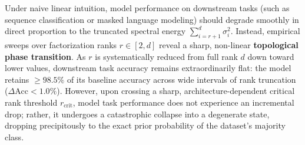 Under naive linear intuition, model performance on downstream tasks (such as sequence classification or masked language modeling) should degrade smoothly in direct proportion to the truncated spectral energy $\sum_{i=r+1}^{d} \sigma_i^2$. Instead, empirical sweeps over factorization ranks $r \in [2, d]$ reveal a sharp, non-linear \textbf{topological phase transition}. As $r$ is systematically reduced from full rank $d$ down toward lower values, downstream task accuracy remains extraordinarily flat: the model retains $\ge 98.5\%$ of its baseline accuracy across wide intervals of rank truncation ($\Delta \text{Acc} < 1.0\%$). However, upon crossing a sharp, architecture-dependent critical rank threshold $r_{\text{crit}}$, model task performance does not experience an incremental drop; rather, it undergoes a catastrophic collapse into a degenerate state, dropping precipitously to the exact prior probability of the dataset's majority class.

